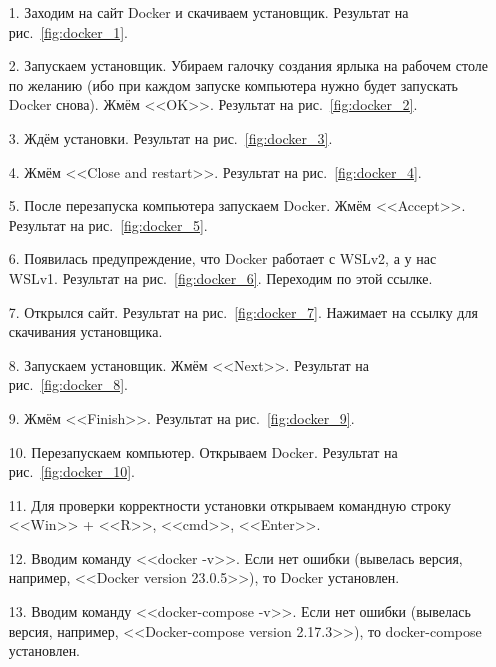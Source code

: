 \begin{enumerate}
    \item[1.] Заходим на сайт Docker и скачиваем установщик. Результат на рис.~\ref{fig:docker_1}.
    \item[2.] Запускаем установщик. Убираем галочку создания ярлыка на рабочем столе по желанию
    (ибо при каждом запуске компьютера нужно будет запускать Docker снова).
    Жмём <<OK>>.
    Результат на рис.~\ref{fig:docker_2}.
    \item[3.] Ждём установки. Результат на рис.~\ref{fig:docker_3}.
    \item[4.] Жмём <<Close and restart>>. Результат на рис.~\ref{fig:docker_4}.
    \item[5.] После перезапуска компьютера запускаем Docker.
    Жмём <<Accept>>.
    Результат на рис.~\ref{fig:docker_5}.
    \item[6.] Появилась предупреждение, что Docker работает с WSLv2, а у нас WSLv1.
    Результат на рис.~\ref{fig:docker_6}. Переходим по этой ссылке.
    \item[7.] Открылся сайт. Результат на рис.~\ref{fig:docker_7}.
    Нажимает на ссылку для скачивания установщика.
    \item[8.] Запускаем установщик. Жмём <<Next>>. Результат на рис.~\ref{fig:docker_8}.
    \item[9.] Жмём <<Finish>>. Результат на рис.~\ref{fig:docker_9}.
    \item[10.] Перезапускаем компьютер. Открываем Docker. Результат на рис.~\ref{fig:docker_10}.
    \item[11.] Для проверки корректности установки открываем командную строку <<Win>> + <<R>>, <<cmd>>, <<Enter>>.
    \item[12.] Вводим команду <<docker -v>>.
    Если нет ошибки (вывелась версия, например, <<Docker version 23.0.5>>), то Docker установлен.
    \item[13.] Вводим команду <<docker-compose -v>>.
    Если нет ошибки (вывелась версия, например, <<Docker-compose version 2.17.3>>), то docker-compose установлен.
\end{enumerate}

